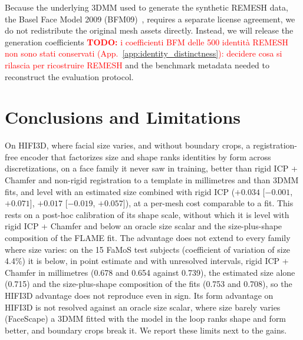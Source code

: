 \documentclass[10pt,twocolumn,letterpaper]{article}
\newcommand{\todo}[1]{\textcolor{red}{\textbf{TODO:} #1}}
\begin{document}
Because the underlying 3DMM used to generate the synthetic REMESH data, the
Basel Face Model 2009 (BFM09)~\cite{paysan2009bfm},
requires a separate license agreement, we do not redistribute the original mesh
assets directly. Instead, we will release the generation coefficients \todo{i coefficienti BFM delle 500 identit\`a REMESH non sono stati conservati (App.~\ref{app:identity_distinctness}): decidere cosa si rilascia per ricostruire REMESH} and the
benchmark metadata needed to reconstruct the evaluation protocol.

\section{Conclusions and Limitations}\label{sec:limitations}
On HIFI3D, where facial size varies, and without boundary crops, a registration-free encoder that factorizes size and shape ranks identities by form across discretizations, on a face family it never saw in training, better than rigid ICP + Chamfer and non-rigid registration to a template in millimetres and than 3DMM fits, and level with an estimated size combined with rigid ICP ($+0.034$ [$-0.001$, $+0.071$], $+0.017$ [$-0.019$, $+0.057$]), at a per-mesh cost comparable to a fit. This rests on a post-hoc calibration of its shape scale, without which it is level with rigid ICP + Chamfer and below an oracle size scalar and the size-plus-shape composition of the FLAME fit. The advantage does not extend to every family where size varies: on the 15 FaMoS test subjects (coefficient of variation of size 4.4\%) it is below, in point estimate and with unresolved intervals, rigid ICP + Chamfer in millimetres (0.678 and 0.654 against 0.739), the estimated size alone (0.715) and the size-plus-shape composition of the fits (0.753 and 0.708), so the HIFI3D advantage does not reproduce even in sign. Its form advantage on HIFI3D is not resolved against an oracle size scalar, where size barely varies (FaceScape) a 3DMM fitted with the model in the loop ranks shape and form better, and boundary crops break it. We report these limits next to the gains.
\end{document}
